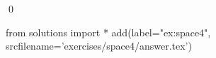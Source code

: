 
\begin{ex} 
  \label{ex:space4}
  
  \qed
\end{ex} 
\begin{python0}
from solutions import *
add(label="ex:space4",
    srcfilename='exercises/space4/answer.tex') 
\end{python0}

